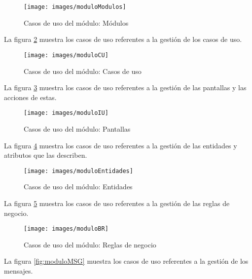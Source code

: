 \begin{figure}[H]
	\begin{center}
		\texttt{[image: images/moduloModulos]}
		\caption{Casos de uso del módulo: Módulos}
		\label{fig:moduloModulos}
	\end{center}
\end{figure}
\newpage
La figura \ref{fig:moduloCU} muestra los casos de uso referentes a la gestión de los casos de uso.

\begin{figure}[H]
	\begin{center}
		\texttt{[image: images/moduloCU]}
		\caption{Casos de uso del módulo: Casos de uso}
		\label{fig:moduloCU}
	\end{center}
\end{figure}
\newpage
La figura \ref{fig:moduloIU} muestra los casos de uso referentes a la gestión de las pantallas y las acciones de estas.

\begin{figure}[H]
	\begin{center}
		\texttt{[image: images/moduloIU]}
		\caption{Casos de uso del módulo: Pantallas}
		\label{fig:moduloIU}
	\end{center}
\end{figure}
\newpage
La figura \ref{fig:moduloEntidades} muestra los casos de uso referentes a la gestión de las entidades y atributos que las describen.

\begin{figure}[H]
	\begin{center}
		\texttt{[image: images/moduloEntidades]}
		\caption{Casos de uso del módulo: Entidades}
		\label{fig:moduloEntidades}
	\end{center}
\end{figure}
\newpage
La figura \ref{fig:moduloBR} muestra los casos de uso referentes a la gestión de las reglas de negocio.

\begin{figure}[H]
	\begin{center}
		\texttt{[image: images/moduloBR]}
		\caption{Casos de uso del módulo: Reglas de negocio}
		\label{fig:moduloBR}
	\end{center}
\end{figure}
\newpage
La figura \ref{fig:moduloMSG} muestra los casos de uso referentes a la gestión de los mensajes.

